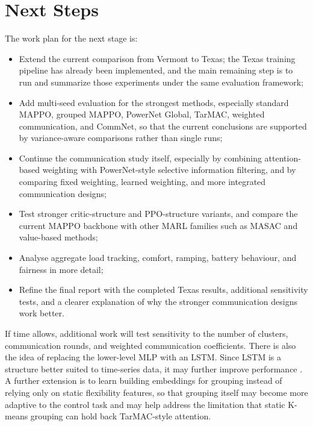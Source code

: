 \section{Next Steps}

The work plan for the next stage is:

\begin{itemize}
  \item Extend the current comparison from Vermont to Texas; the Texas training
  pipeline has already been implemented, and the main remaining step is to run
  and summarize those experiments under the same evaluation framework;
  \item Add multi-seed evaluation for the strongest methods, especially standard
  MAPPO, grouped MAPPO, PowerNet Global, TarMAC, weighted communication, and
  CommNet, so that the current conclusions are supported by variance-aware
  comparisons rather than single runs;
  \item Continue the communication study itself, especially by combining
  attention-based weighting with PowerNet-style selective information filtering,
  and by comparing fixed weighting, learned weighting, and more integrated
  communication designs;
  \item Test stronger critic-structure and PPO-structure variants, and compare
  the current MAPPO backbone with other MARL families such as MASAC and
  value-based methods;
  \item Analyse aggregate load tracking, comfort, ramping, battery behaviour,
  and fairness in more detail;
  \item Refine the final report with the completed Texas results, additional
  sensitivity tests, and a clearer explanation of why the stronger communication
  designs work better.
\end{itemize}

If time allows, additional work will test sensitivity to the number of
clusters, communication rounds, and weighted communication coefficients. There
is also the idea of replacing the lower-level MLP with an LSTM. Since LSTM is a
structure better suited to time-series data, it may further improve
performance \cite{lstm1997}. A further extension is to learn building
embeddings for grouping instead of relying only on static flexibility features,
so that grouping itself may become more adaptive to the control task and may
help address the limitation that static K-means grouping can hold back
TarMAC-style attention.
